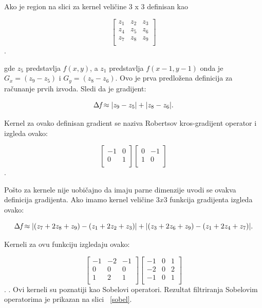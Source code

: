 \documentclass[a4paper,12pt,titlepage]{article}
\begin{document}
Ako je region na slici za kernel veličine 3 x 3 definisan kao

 \[
\begin{bmatrix}
     z_{1} & z_{2} & z_{3} \\
     z_{4} & z_{5} & z_{6} \\
     z_{7} & z_{8} & z_{9} \\
\end{bmatrix}
\].

gde $z_{5}$ predstavlja $f(x, y)$, a $z_{1}$ predstavlja $f(x - 1, y - 1)$ onda je $G_{x} = (z_{9} - z_{5})$ i $G_{y} = (z_{8} - z_{6})$. Ovo je prva predložena definicija za računanje prvih izvoda. Sledi da je gradijent:

\begin{equation}\label{eq:grad13}
\Delta \emph{f} \approx |z_{9} - z_{5}| + |z_{8} - z_{6}|.
\end{equation}

Kernel za ovako definisan gradient se naziva Robertsov kros-gradijent operator i izgleda ovako:

 \[
\begin{bmatrix}
     -1 & 0 \\
     0 & 1 \\
\end{bmatrix}
\begin{bmatrix}
     0 & -1 \\
     1 & 0 \\
\end{bmatrix}
\].

Pošto za kernele nije uobičajno da imaju parne dimenzije uvodi se ovakva definicija gradijenta. Ako imamo kernel veličine $3 x 3$ funkcija gradijenta izgleda ovako: 

\begin{equation}\label{eq:grad14}
\Delta \emph{f} \approx |(z_7 + 2z_8 + z_9) - (z_1 + 2z_2 + z_3)| + |(z_3 + 2z_6 + z_9) - (z_1 + 2z_4 + z_7)|.
\end{equation}

\newpage
Kerneli za ovu funkciju izgledaju ovako: 

 \[
\begin{bmatrix}
     -1 & -2 & -1 \\
     0 & 0 & 0 \\
     1 & 2 & 1 \\
\end{bmatrix}
\begin{bmatrix}
     -1 & 0 & 1 \\
     -2 & 0 & 2 \\
     -1 & 0 & 1 \\
\end{bmatrix}
\].
.
Ovi kerneli su poznatiji kao Sobelovi operatori. Rezultat filtriranja Sobelovim operatorima je prikazan na slici ~\ref{sobel}.
\end{document}
